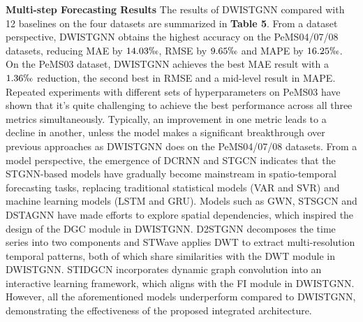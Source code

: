 \documentclass[final,12pt]{elsarticle}
\begin{document}
\noindent \textbf{Multi-step Forecasting Results}
The results of DWISTGNN compared with 12 baselines 
on the four datasets are summarized in \textbf{Table 5}.
From a dataset perspective, 
DWISTGNN obtains the highest accuracy on the PeMS04/07/08 datasets, 
reducing MAE by $14.03\permil$, RMSE by $9.65\permil$ and MAPE by $16.25\permil$.
On the PeMS03 dataset, DWISTGNN achieves the best MAE result with a $1.36\permil$ reduction, 
the second best in RMSE and a mid-level result in MAPE.
Repeated experiments with different sets of hyperparameters on PeMS03 
have shown that it's quite challenging 
to achieve the best performance across all three metrics simultaneously.
Typically, an improvement in one metric leads to a decline in another, 
unless the model makes a significant breakthrough over previous approaches 
as DWISTGNN does on the PeMS04/07/08 datasets.
From a model perspective, 
the emergence of DCRNN and STGCN indicates that 
the STGNN-based models have gradually become mainstream 
in spatio-temporal forecasting tasks, 
replacing traditional statistical models (VAR and SVR) 
and machine learning models (LSTM and GRU).
Models such as GWN, STSGCN and DSTAGNN 
have made efforts to explore spatial dependencies, 
which inspired the design of the DGC module in DWISTGNN.
D2STGNN decomposes the time series into two components and 
STWave applies DWT to extract multi-resolution temporal patterns, 
both of which share similarities with the DWT module in DWISTGNN.
STIDGCN incorporates dynamic graph convolution into an interactive learning framework, 
which aligns with the FI module in DWISTGNN.
However, all the aforementioned models underperform compared to DWISTGNN, 
demonstrating the effectiveness of the proposed integrated architecture.
\end{document}
